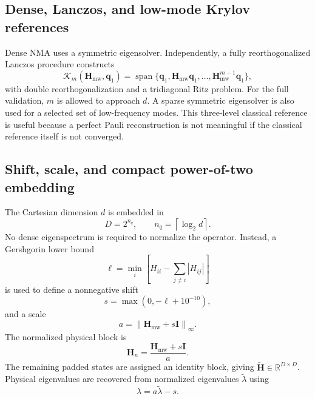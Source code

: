 \documentclass[aip,jcp,reprint,amsmath,amssymb,floatfix]{revtex4-2}
\newcommand{\Hmw}{\mathbf{H}_{\mathrm{mw}}}
\newcommand{\Hp}{\widetilde{\mathbf{H}}}
\newcommand{\norm}[1]{\left\lVert #1 \right\rVert}
\begin{document}
\subsection{Dense, Lanczos, and low-mode Krylov references}
Dense NMA uses a symmetric eigensolver. Independently, a fully reorthogonalized Lanczos procedure constructs
\begin{equation}
\mathcal{K}_m(\Hmw,\mathbf{q}_1)=
\operatorname{span}\{\mathbf{q}_1,\Hmw\mathbf{q}_1,\ldots,\Hmw^{m-1}\mathbf{q}_1\},
\end{equation}
with double reorthogonalization and a tridiagonal Ritz problem. For the full validation, $m$ is allowed to approach $d$. A sparse symmetric eigensolver is also used for a selected set of low-frequency modes. This three-level classical reference is useful because a perfect Pauli reconstruction is not meaningful if the classical reference itself is not converged.

\subsection{Shift, scale, and compact power-of-two embedding}
The Cartesian dimension $d$ is embedded in
\begin{equation}
D=2^{n_q},\qquad n_q=\left\lceil\log_2 d\right\rceil.
\label{eq:qubits}
\end{equation}
No dense eigenspectrum is required to normalize the operator. Instead, a Gershgorin lower bound
\begin{equation}
\ell=\min_i\left[H_{ii}-\sum_{j\neq i}|H_{ij}|\right]
\end{equation}
is used to define a nonnegative shift
\begin{equation}
s=\max(0,-\ell+10^{-10}),
\end{equation}
and a scale
\begin{equation}
a=\norm{\Hmw+s\mathbf{I}}_{\infty}.
\end{equation}
The normalized physical block is
\begin{equation}
\mathbf{H}_n=\frac{\Hmw+s\mathbf{I}}{a}.
\end{equation}
The remaining padded states are assigned an identity block, giving $\Hp\in\mathbb{R}^{D\times D}$. Physical eigenvalues are recovered from normalized eigenvalues $\tilde\lambda$ using
\begin{equation}
\lambda=a\tilde\lambda-s.
\label{eq:unscale}
\end{equation}
\end{document}
